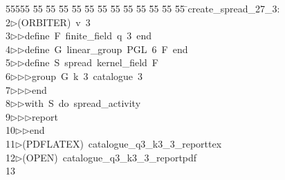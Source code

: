 %
%
\begin{tabbing}
55555 \= 55 \= 55 \= 55 \= 55 \= 55 \= 55 \= 55 \= 55 \= 55 \= 55 \= 55 \= 55 \= \>create\_spread\_27\_3:\\[0pt]
2\>$\triangleright$\>(ORBITER)\ v\ 3\ \\[0pt]
3\>$\triangleright$\>$\triangleright$\>define\ F\ finite\_field\ q\ 3\ end\ \\[0pt]
4\>$\triangleright$\>$\triangleright$\>define\ G\ linear\_group\ PGL\ 6\ F\ end\ \\[0pt]
5\>$\triangleright$\>$\triangleright$\>define\ S\ spread\ kernel\_field\ F\ \\[0pt]
6\>$\triangleright$\>$\triangleright$\>$\triangleright$\>group\ G\ k\ 3\ catalogue\ 3\ \\[0pt]
7\>$\triangleright$\>$\triangleright$\>$\triangleright$\>end\ \\[0pt]
8\>$\triangleright$\>$\triangleright$\>with\ S\ do\ spread\_activity\ \\[0pt]
9\>$\triangleright$\>$\triangleright$\>$\triangleright$\>report\ \\[0pt]
10\>$\triangleright$\>$\triangleright$\>end\\[0pt]
11\>$\triangleright$\>(PDFLATEX)\ catalogue\_q3\_k3\_3\_reporttex\\[0pt]
12\>$\triangleright$\>(OPEN)\ catalogue\_q3\_k3\_3\_reportpdf\\[0pt]
13\>\end{tabbing}
